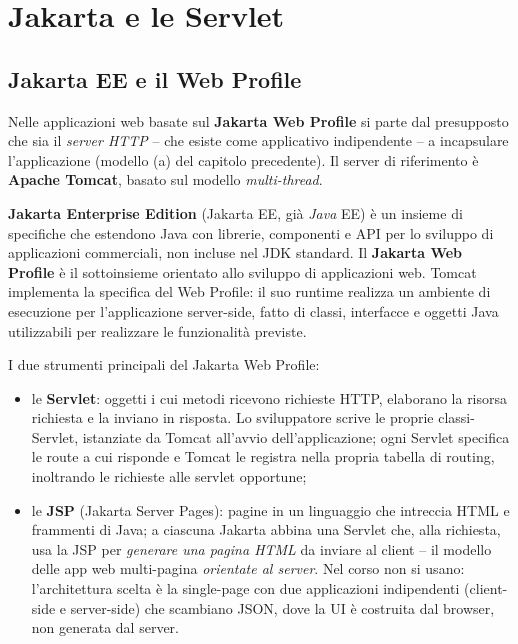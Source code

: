 \chapter{Jakarta e le Servlet}

\section{Jakarta EE e il Web Profile}

Nelle applicazioni web basate sul \textbf{Jakarta Web Profile} si parte dal presupposto che
sia il \emph{server HTTP} -- che esiste come applicativo indipendente -- a incapsulare
l'applicazione (modello (a) del capitolo precedente). Il server di riferimento \`e
\textbf{Apache Tomcat}, basato sul modello \emph{multi-thread}.

\begin{definizione}
\textbf{Jakarta Enterprise Edition} (Jakarta EE, gi\`a \emph{Java} EE) \`e un insieme di
specifiche che estendono Java con librerie, componenti e API per lo sviluppo di applicazioni
commerciali, non incluse nel JDK standard. Il \textbf{Jakarta Web Profile} \`e il
sottoinsieme orientato allo sviluppo di applicazioni web. Tomcat implementa la specifica del
Web Profile: il suo runtime realizza un ambiente di esecuzione per l'applicazione
server-side, fatto di classi, interfacce e oggetti Java utilizzabili per realizzare le
funzionalit\`a previste.
\end{definizione}

I due strumenti principali del Jakarta Web Profile:
\begin{itemize}
  \item le \textbf{Servlet}: oggetti i cui metodi ricevono richieste HTTP, elaborano la
        risorsa richiesta e la inviano in risposta. Lo sviluppatore scrive le proprie
        classi-Servlet, istanziate da Tomcat all'avvio dell'applicazione; ogni Servlet
        specifica le route a cui risponde e Tomcat le registra nella propria tabella di
        routing, inoltrando le richieste alle servlet opportune;
  \item le \textbf{JSP} (Jakarta Server Pages): pagine in un linguaggio che intreccia HTML e
        frammenti di Java; a ciascuna Jakarta abbina una Servlet che, alla richiesta, usa la
        JSP per \emph{generare una pagina HTML} da inviare al client -- il modello delle app
        web multi-pagina \emph{orientate al server}. Nel corso non si usano: l'architettura
        scelta \`e la single-page con due applicazioni indipendenti (client-side e
        server-side) che scambiano JSON, dove la UI \`e costruita dal browser, non generata
        dal server.
\end{itemize}

